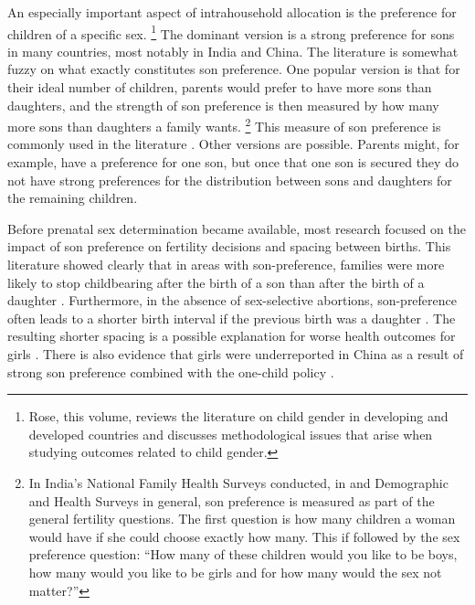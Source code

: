 \documentclass[letterpaper,12pt]{article}
\begin{document}
An especially important aspect of intrahousehold allocation is the
preference for children of a specific sex.%
\footnote{
Rose, this volume, reviews the literature on child gender in developing
and developed countries and discusses methodological issues that arise
when studying outcomes related to child gender.} 
The dominant version is a strong preference for sons in many countries,
most notably in India and China. 
The literature is somewhat fuzzy on what exactly constitutes son
preference. 
One popular version is that for their ideal number of children, parents
would prefer to have more sons than daughters, and the strength of son
preference is then measured by how many more sons than daughters a
family wants.%
\footnote{
In India's National Family Health Surveys conducted, in and Demographic
and Health Surveys in general, son preference is measured as part of the
general fertility questions. 
The first question is how many children a woman would have if she could
choose exactly how many. 
This if followed by the sex preference question: ``How many of these
children would you like to be boys, how many would you like to be girls
and for how many would the sex not matter?''} This measure of son
preference is commonly used in the literature
\citep[e.g.]{clark00,Jensen2009,Hu2015}. 
Other versions are possible. 
Parents might, for example, have a preference for one son, but once that
one son is secured they do not have strong preferences for the
distribution between sons and daughters for the remaining children.

Before prenatal sex determination became available, most research
focused on the impact of son preference on fertility decisions and
spacing between births. 
This literature showed clearly that in areas with son-preference,
families were more likely to stop childbearing after the birth of a son
than after the birth of a daughter \citep[see, for
example,][]{Das1987,Arnold1997,clark00,filmer09}. 
Furthermore, in the absence of sex-selective abortions, son-preference
often leads to a shorter birth interval if the previous birth was a
daughter \citep[see, for
example,][]{Das1987,Rahman1993,Pong1994,Haughton1996,Arnold1997}. 
The resulting shorter spacing is a possible explanation for worse health
outcomes for girls
\citep{arnold98,Whitworth2002,Rutstein2005,Conde-Agudelo2006}. 
There is also evidence that girls were underreported in China as a
result of strong son preference combined with the one-child policy
\citep{Merli2000,Goodkind2011}.
\end{document}
